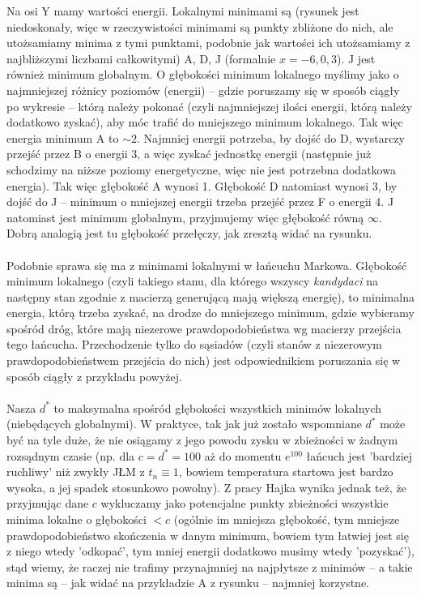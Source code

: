 \documentclass[a4paper]{article}
\theoremstyle{defn}
\theoremstyle{theorem}
\theoremstyle{lemma}
\theoremstyle{cor}
\theoremstyle{fact}
\begin{document}
Na osi Y mamy wartości energii. Lokalnymi minimami są (rysunek jest niedoskonały, więc w rzeczywistości minimami są punkty zbliżone do nich, ale utożsamiamy minima z tymi punktami, podobnie jak wartości ich utożsamiamy z najbliższymi liczbami całkowitymi) A, D, J (formalnie $x=-6, 0, 3$). J jest również minimum globalnym. O głębokości minimum lokalnego myślimy jako o najmniejszej różnicy poziomów (energii) – gdzie poruszamy się w sposób ciągły po wykresie – którą należy pokonać (czyli najmniejszej ilości energii, którą należy dodatkowo zyskać), aby móc trafić do mniejszego minimum lokalnego. Tak więc energia minimum A to $\sim 2$. Najmniej energii potrzeba, by dojść do D, wystarczy przejść przez B o energii 3, a więc zyskać jednostkę energii (następnie już schodzimy na niższe poziomy energetyczne, więc nie jest potrzebna dodatkowa energia). Tak więc głębokość A wynosi 1. Głębokość D natomiast wynosi 3, by dojść do J – minimum o mniejszej energii trzeba przejść przez F o energii 4. J natomiast jest minimum globalnym, przyjmujemy więc głębokość równą $\infty$. Dobrą analogią jest tu głębokość przełęczy, jak zresztą widać na rysunku.\\\\
 Podobnie sprawa się ma z minimami lokalnymi w łańcuchu Markowa. Głębokość minimum lokalnego (czyli takiego stanu, dla którego wszyscy \textit{kandydaci} na następny stan zgodnie z macierzą generującą mają większą energię), to minimalna energia, którą trzeba zyskać, na drodze do mniejszego minimum, gdzie wybieramy spośród dróg, które mają niezerowe prawdopodobieństwa wg macierzy przejścia tego łańcucha. Przechodzenie tylko do sąsiadów (czyli stanów z niezerowym prawdopodobieństwem przejścia do nich) jest odpowiednikiem poruszania się w sposób ciągły z przykładu powyżej.\\\\
Nasza $d^*$ to maksymalna spośród głębokości wszystkich minimów lokalnych (niebędących globalnymi). W praktyce, tak jak już zostało wspomniane $d^*$ może być na tyle duże, że nie osiągamy z jego powodu zysku w zbieżności w żadnym rozsądnym czasie (np. dla $c=d^*=100$ aż do momentu $e^{100}$ łańcuch jest 'bardziej ruchliwy' niż zwykły JŁM z $t_n \equiv 1$, bowiem temperatura startowa jest bardzo wysoka, a jej spadek stosunkowo powolny). Z pracy Hajka wynika jednak też, że przyjmując dane $c$ wykluczamy jako potencjalne punkty zbieżności wszystkie minima lokalne o głębokości $<c$ (ogólnie im mniejsza głębokość, tym mniejsze prawdopodobieństwo skończenia w danym minimum, bowiem tym łatwiej jest się z niego wtedy 'odkopać', tym mniej energii dodatkowo musimy wtedy 'pozyskać'), stąd wiemy, że raczej nie trafimy przynajmniej na najpłytsze z minimów – a takie minima są – jak widać na przykładzie A z rysunku – najmniej korzystne.\\\\
\end{document}
